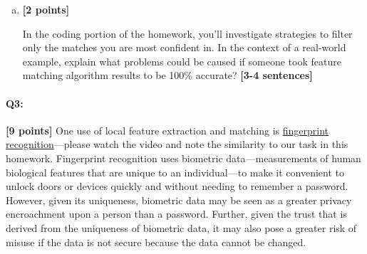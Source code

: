 \documentclass[11pt]{article}
\begin{document}
\begin{enumerate}[(a)]
    \pagebreak
    \item \textbf{[2 points]} 
    \begin{tcolorbox}[colback=orange!5!white,colframe=orange!75!black]
     In the coding portion of the homework, you'll investigate strategies to filter only the matches you are most confident in. In the context of a real-world example, explain what problems could be caused if someone took feature matching algorithm results to be 100\% accurate? \textbf{[3-4 sentences]}
    \end{tcolorbox}

\end{enumerate}

\pagebreak
\paragraph{Q3:} \textbf{[9 points]} One use of local feature extraction and matching is \href{https://www.youtube.com/watch?v=xD88Qs_DZp4}{fingerprint recognition}---please watch the video and note the similarity to our task in this homework. Fingerprint recognition uses biometric data---measurements of human biological features that are unique to an individual---to make it convenient to unlock doors or devices quickly and without needing to remember a password. However, given its uniqueness, biometric data may be seen as a greater privacy encroachment upon a person than a password. Further, given the trust that is derived from the uniqueness of biometric data, it may also pose a greater risk of misuse if the data is not secure because the data cannot be changed.
\end{document}

